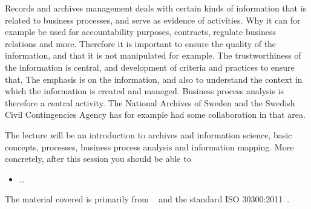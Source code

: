 Records and archives management deals with certain kinds of information that is 
related to business processes, and serve as evidence of activities.
Why it can for example be used for accountability purposes, contracts, regulate 
business relations and more.
Therefore it is important to ensure the quality of the information, and that it 
is not manipulated for example.
The trustworthiness of the information is central, and development of criteria 
and practices to ensure that.
The emphasis is on the information, and also to understand the context in which 
the information is created and managed.
Business process analysis is therefore a central activity.
The National Archives of Sweden and the Swedish Civil Contingencies Agency has 
for example had some collaboration in that area.

The lecture will be an introduction to archives and information science, basic 
concepts, processes, business process analysis and information mapping.
More concretely, after this session you should be able to
\begin{itemize}
  \item \dots
\end{itemize}

The material covered is primarily from ~\cite{infokartl} 
and the standard ISO 30300:2011~\cite{ISO30300:2011}.

